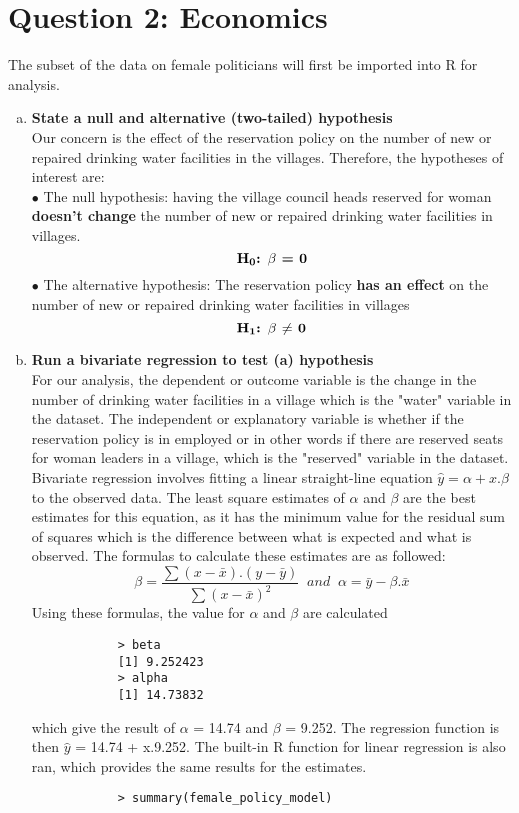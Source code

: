 \documentclass[12pt,letterpaper]{article}
\begin{document}
	\section*{Question 2: Economics}
	\noindent The subset of the data on female politicians will first be imported into R for analysis.
		
	\begin{enumerate} [(a)]
	\item \textbf{State a null and alternative (two-tailed) hypothesis} \\
	Our concern is the effect of the reservation policy on the number of new or repaired drinking water facilities in the villages. Therefore, the hypotheses of interest are: \\
	$\bullet$ The null hypothesis: having the village council heads reserved for woman \textbf{doesn't change} the number of new or repaired drinking water facilities in villages.
		$${\textbf{H\textsubscript{0}: $\beta$ = 0}}$$
	$\bullet$ The alternative hypothesis: The reservation policy \textbf{has an effect} on  the number of new or repaired drinking water facilities in villages
		$${\textbf{H\textsubscript{1}: $\beta$ $\neq$ 0}}$$
		
	\item \textbf{Run a bivariate regression to test (a) hypothesis} \\
	For our analysis, the dependent or outcome variable is the change in the number of drinking water facilities in a village which is the "water" variable in the dataset. The independent or explanatory variable is whether if the reservation policy is in employed or in other words if there are reserved seats for woman leaders in a village, which is the "reserved" variable in the dataset. \\
	Bivariate regression involves fitting a linear straight-line equation $\hat{y} = \alpha + x.\beta$ to the observed data. The least square estimates of $\alpha$ and $\beta$ are the best estimates for this equation, as it has the minimum value for the residual sum of squares which is the difference between what is expected and what is observed. The formulas to calculate these estimates are as followed:
		$$ \beta = \frac{\sum (x - \bar{x}).(y - \bar{y})}{\sum (x - \bar{x})^2} \; \; and \; \; \alpha = \bar{y} - \beta.\bar{x}$$ 
	Using these formulas, the value for $\alpha$ and $\beta$ are calculated
		
		\begin{verbatim}
			> beta
			[1] 9.252423
			> alpha
			[1] 14.73832
		\end{verbatim}
	which give the result of $\alpha$ = 14.74 and $\beta$ = 9.252. The regression function is then $\hat{y}$ = 14.74 + x.9.252. The built-in R function for linear regression is also ran, which provides the same results for the estimates.
		
		\begin{verbatim}
			> summary(female_policy_model)
			

\end{verbatim}
\end{enumerate}
\end{document}

